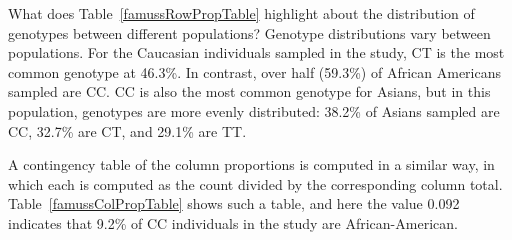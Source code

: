 \begin{example}{What does Table~\ref{famussRowPropTable} highlight about the distribution of genotypes between different populations?} 
Genotype distributions vary between populations. For the Caucasian individuals sampled in the study, CT is the most common genotype at 46.3\%. In contrast, over half (59.3\%) of African Americans sampled are CC. CC is also the most common genotype for Asians, but in this population, genotypes are more evenly distributed: 38.2\% of Asians sampled are CC, 32.7\% are CT, and 29.1\% are TT.
\end{example}

A contingency table of the column proportions is computed in a similar way, in which each  is computed as the count divided by the corresponding column total. Table~\ref{famussColPropTable} shows such a table, and here the value 0.092 indicates that 9.2\% of CC individuals in the study are African-American.

